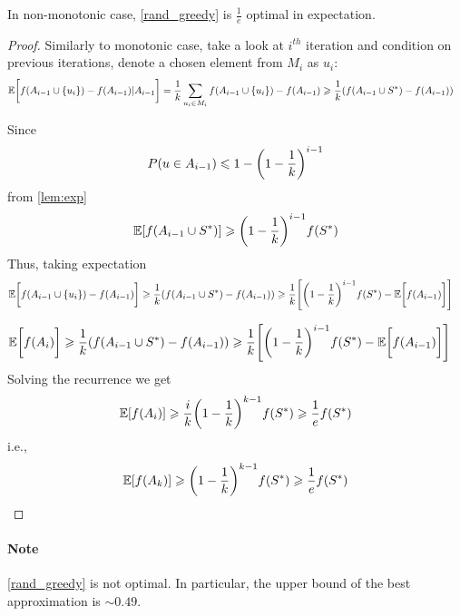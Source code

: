 \begin{theorem}
	In non-monotonic case, \vref{rand_greedy} is $\frac{1}{e}$ optimal in expectation.
	\begin{proof}
		Similarly to monotonic case, take a look at $i^{th}$ iteration and condition on previous iterations, denote a chosen element from $M_i$ as $u_i$:
		\begin{align}
		\mathbb{E} \qty\bigg[f(A_{i-1} \cup \qty{u_i}) - f(A_{i-1}) | A_{i-1} ] &= \frac{1}{k} \sum_{u_i \in M_i} f(A_{i-1} \cup \qty{u_i}) - f(A_{i-1}) \geqslant \frac{1}{k} \qty(f(A_{i-1} \cup S^*) - f(A_{i-1}) )
		\end{align}
		
		
		Since
		\begin{align}
		P(u\in A_{i-1}) \leqslant 1 - \qty(1-\frac{1}{k})^{i-1}
		\end{align}
		from \vref{lem:exp}
		\begin{align}
		\mathbb{E}\qty[f(A_{i-1} \cup S^*)] \geqslant \qty(1-\frac{1}{k})^{i-1}f(S^*)
		\end{align}
		Thus, taking expectation		
		\begin{align}
		\mathbb{E} \qty\bigg[f(A_{i-1} \cup \qty{u_i}) - f(A_{i-1}) ] &\geqslant \frac{1}{k} \qty(f(A_{i-1} \cup S^*) - f(A_{i-1}) ) \geqslant \frac{1}{k}  \qty[\qty(1-\frac{1}{k})^{i-1}f(S^*) - \mathbb{E} \qty\bigg[f(A_{i-1})] ]
		\end{align}
			
		\begin{align}
		\mathbb{E} \qty\bigg[f(A_{i} )] &\geqslant \frac{1}{k} \qty(f(A_{i-1} \cup S^*) - f(A_{i-1}) ) \geqslant \frac{1}{k}  \qty[\qty(1-\frac{1}{k})^{i-1}f(S^*) - \mathbb{E} \qty\bigg[f(A_{i-1})] ]
		\end{align}
		Solving the recurrence we get
		\begin{align}
		\mathbb{E} \qty[f(A_i)] \geqslant \frac{i}{k} \qty(1-\frac{1}{k})^{k-1} f(S^*) \geqslant \frac{1}{e}f(S^*) 
		\end{align}
		i.e.,
		\begin{align}
		\mathbb{E} \qty[f(A_k)] \geqslant  \qty(1-\frac{1}{k})^{k-1} f(S^*) \geqslant \frac{1}{e}f(S^*) 
		\end{align}
		
		
	\end{proof}
\end{theorem}

\paragraph{Note} \vref{rand_greedy} is not optimal. In particular, the upper bound of the best approximation is $\sim0.49$.
